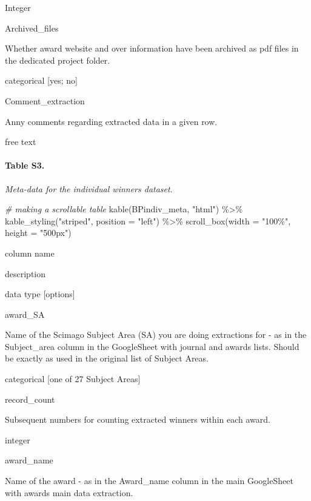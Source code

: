 \documentclass[
]{article}
\newenvironment{Shaded}{\begin{snugshade}}{\end{snugshade}}
\newcommand{\AttributeTok}[1]{\textcolor[rgb]{0.77,0.63,0.00}{#1}}
\newcommand{\CommentTok}[1]{\textcolor[rgb]{0.56,0.35,0.01}{\textit{#1}}}
\newcommand{\FunctionTok}[1]{\textcolor[rgb]{0.00,0.00,0.00}{#1}}
\newcommand{\NormalTok}[1]{#1}
\newcommand{\SpecialCharTok}[1]{\textcolor[rgb]{0.00,0.00,0.00}{#1}}
\newcommand{\StringTok}[1]{\textcolor[rgb]{0.31,0.60,0.02}{#1}}
\begin{document}
Integer

Archived\_files

Whether award website and over information have been archived as pdf
files in the dedicated project folder.

categorical {[}yes; no{]}

Comment\_extraction

Anny comments regarding extracted data in a given row.

free text

\hypertarget{table-s3.}{%
\paragraph{Table S3.}\label{table-s3.}}

\emph{Meta-data for the individual winners dataset}.

\begin{Shaded}
\begin{Highlighting}[]
\CommentTok{\# making a scrollable table}
\FunctionTok{kable}\NormalTok{(BPindiv\_meta, }\StringTok{"html"}\NormalTok{) }\SpecialCharTok{\%\textgreater{}\%}
  \FunctionTok{kable\_styling}\NormalTok{(}\StringTok{"striped"}\NormalTok{, }\AttributeTok{position =} \StringTok{"left"}\NormalTok{) }\SpecialCharTok{\%\textgreater{}\%}
  \FunctionTok{scroll\_box}\NormalTok{(}\AttributeTok{width =} \StringTok{"100\%"}\NormalTok{, }\AttributeTok{height =} \StringTok{"500px"}\NormalTok{)}
\end{Highlighting}
\end{Shaded}

column name

description

data type {[}options{]}

award\_SA

Name of the Scimago Subject Area (SA) you are doing extractions for - as
in the Subject\_area column in the GoogleSheet with journal and awards
lists. Should be exactly as used in the original list of Subject Areas.

categorical {[}one of 27 Subject Areas{]}

record\_count

Subsequent numbers for counting extracted winners within each award.

integer

award\_name

Name of the award - as in the Award\_name column in the main GoogleSheet
with awards main data extraction.
\end{document}
